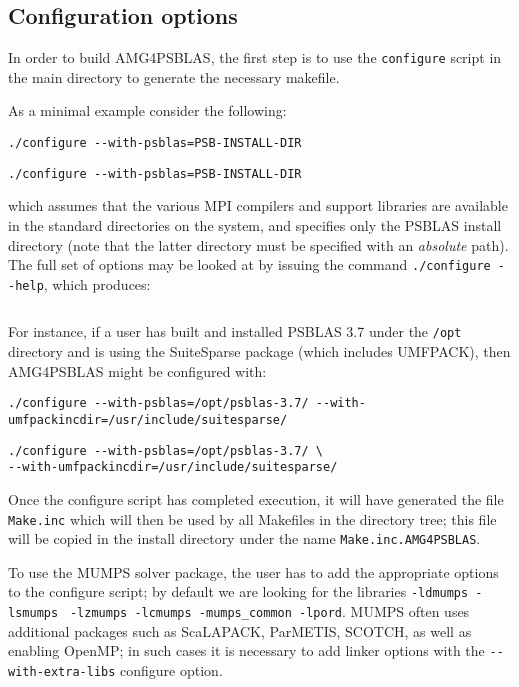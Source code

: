\subsection{Configuration options}

In order to build AMG4PSBLAS, the first step is to use the \verb|configure| script
in the main directory to generate the necessary makefile.

As a minimal example consider the following:
\ifpdf
\begin{verbatim}
./configure --with-psblas=PSB-INSTALL-DIR
\end{verbatim}
\else
\begin{verbatim}
./configure --with-psblas=PSB-INSTALL-DIR
\end{verbatim}
\fi
which assumes that the various MPI compilers and support libraries are
available in the standard directories on the system, and specifies
only the PSBLAS install  directory (note that the latter directory must
be specified with an {\em absolute} path).
The full set of options may be looked at by issuing the command
\verb|./configure --help|, which produces:
\ifpdf
\inputminted[breaklines=true,bgcolor=bg,fontsize=\small]{console}{../configureout.txt}
\else

\fi
For instance, if a user has built and installed PSBLAS 3.7 under the
\verb|/opt| directory and is
using the SuiteSparse package (which includes UMFPACK), then AMG4PSBLAS
might be configured with:
\ifpdf
\begin{verbatim}
./configure --with-psblas=/opt/psblas-3.7/ --with-umfpackincdir=/usr/include/suitesparse/
\end{verbatim}
\else
\begin{verbatim}
./configure --with-psblas=/opt/psblas-3.7/ \
--with-umfpackincdir=/usr/include/suitesparse/
\end{verbatim}
\fi
Once the configure script has completed execution, it will have
generated the file \verb|Make.inc| which will then be used by all
Makefiles in the directory tree; this file will be copied in the
install directory under the name \verb|Make.inc.AMG4PSBLAS|.

To use the MUMPS solver package,
the user has to add the appropriate options to the configure script;
by default we are looking for the libraries
\verb|-ldmumps -lsmumps| \verb| -lzmumps -lcmumps -mumps_common -lpord|.
MUMPS often uses additional packages such as ScaLAPACK, ParMETIS,
SCOTCH, as well as enabling OpenMP; in such cases it is necessary to
add linker options with the \verb|--with-extra-libs| configure option.

